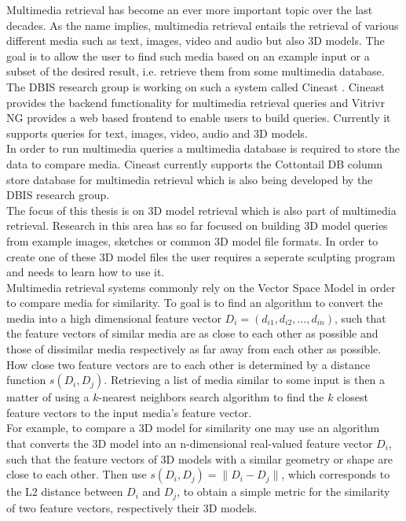 Multimedia retrieval has become an ever more important topic over the last decades. As the name implies, multimedia retrieval entails the retrieval of various different media such as text, images, video and audio but also
3D models. The goal is to allow the user to find such media based on an example input or a subset of the desired result, i.e. retrieve them from some multimedia database.\\
The DBIS research group \cite{dbis_group} is working on such a system called Cineast \cite{cineast}. Cineast provides the backend functionality for multimedia retrieval queries and Vitrivr NG \cite{vitrivr_ng} provides a web
based frontend to enable users to build queries. Currently it supports queries for text, images, video, audio and 3D models.\\
In order to run multimedia queries a multimedia database is required to store the data to compare media. Cineast currently supports the Cottontail DB \cite{cottontaildb} column store database for multimedia retrieval which is also being developed by the DBIS research group.\\
The focus of this thesis is on 3D model retrieval which is also part of multimedia retrieval. Research in this area has so far focused on building 3D model queries from example images, sketches or common 3D model file formats.
In order to create one of these 3D model files the user requires a seperate sculpting program and needs to learn how to use it.\\
Multimedia retrieval systems commonly rely on the Vector Space Model \cite{vector_space_model:1975} in order to compare media for similarity. To goal is to find an algorithm to convert the media into a high dimensional feature vector $D_i = (d_{i1}, d_{i2}, ..., d_{in})$, such that the feature vectors of similar media are as close to each other as possible and those of dissimilar media respectively as far away from each other as possible. How close two feature vectors are to each other is determined by a distance function $s(D_i, D_j)$. Retrieving a list of media similar to some input is then a matter of using a $k$-nearest neighbors search \cite{k_nearest_neighbors:2000} algorithm to find the $k$ closest feature vectors to the input media's feature vector.\\
For example, to compare a 3D model for similarity one may use an algorithm that converts the 3D model into an n-dimensional real-valued feature vector $D_i$, such that the feature vectors of 3D models with a similar geometry or shape are close to each other. Then use $s(D_i, D_j) = \lVert D_i - D_j \rVert$, which corresponds to the L2 distance between $D_i$ and $D_j$, to obtain a simple metric for the similarity of two feature vectors, respectively their 3D models.

